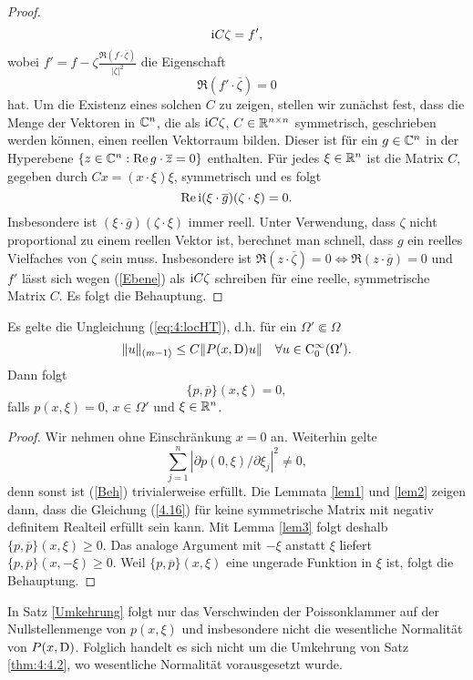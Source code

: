 \begin{proof}
\begin{equation}
	\mathrm i C \zeta = f',
\end{equation}
wobei $f' = f - \zeta \frac{\Re( f\cdot\overline\zeta)}{|\zeta|^2}$ die Eigenschaft
\begin{equation}
	\label{Ebene}
\Re (f'\cdot\overline\zeta) = 0
\end{equation}
hat. Um die Existenz eines solchen $C$ zu zeigen, stellen wir zunächst fest, dass die Menge der Vektoren in $\mathbb C^n$, die als $\mathrm i C \zeta$, $C \in \mathbb R^{n \times n}$ symmetrisch, geschrieben werden können, einen reellen Vektorraum bilden. Dieser ist für ein $g \in \mathbb C^n$ in der Hyperebene $\{ z \in \mathbb C^n : \operatorname{Re} g\cdot \overline z = 0 \}$ enthalten. Für jedes $\xi \in \mathbb R^n$ ist die Matrix $C$, gegeben durch $C x =  (x\cdot\xi)\xi$, symmetrisch und es folgt
\begin{equation}
\operatorname{Re} \mathrm i (\xi\cdot\overline g)(\zeta\cdot\xi) = 0.
\end{equation}
Insbesondere ist $(\xi\cdot\overline g)(\zeta\cdot\xi) $ immer reell. Unter Verwendung, dass $\zeta$ nicht proportional zu einem reellen Vektor ist, berechnet man schnell, dass $g$ ein reelles Vielfaches von $\zeta$ sein muss. Insbesondere ist $\Re(z\cdot\overline\zeta) = 0 \Leftrightarrow \Re(z\cdot \overline g) = 0$ und $f'$ lässt sich wegen (\ref{Ebene}) als $\mathrm i C \zeta$ schreiben für eine reelle, symmetrische Matrix $C$.  Es folgt die Behauptung.
\end{proof}

\begin{thm}
\label{Umkehrung}
Es gelte die Ungleichung (\ref{eq:4:locHT}), d.h. für ein $\Omega'\Subset\Omega$
\begin{equation}
  \| u\|_{(m-1)} \le C \| P(x,\mathrm D) u \| \quad \forall u\in\mathrm C_0^\infty(\Omega').
\end{equation}
Dann folgt 
\begin{equation}
	\label{Beh}
\{p,\overline p\} (x,\xi) = 0,
\end{equation}
falls $p(x,\xi) = 0$, $x \in \Omega'$ und $ \xi \in \mathbb R^n$.
\end{thm}
\begin{proof}
Wir nehmen ohne Einschränkung $x=0$ an. Weiterhin gelte
\begin{equation}
\sum_{j=1}^{n}|\partial p(0,\xi)/\partial \xi_j|^2 \neq 0,
\end{equation}
denn sonst ist (\ref{Beh}) trivialerweise erfüllt. Die Lemmata \ref{lem1} und \ref{lem2} zeigen dann, dass die Gleichung (\ref{4.16}) für keine symmetrische Matrix mit negativ definitem Realteil erfüllt sein kann. Mit Lemma \ref{lem3} folgt deshalb $\{p,\overline p\}(x,\xi) \ge 0$. Das analoge Argument mit $-\xi$ anstatt $\xi$ liefert $\{p,\overline p\}(x,-\xi) \ge 0$. Weil $\{p,\overline p\}(x,\xi)$ eine ungerade Funktion in $\xi$ ist, folgt die Behauptung.
\end{proof}
\begin{rem}
In Satz \ref{Umkehrung} folgt nur das Verschwinden der Poissonklammer auf der Nullstellenmenge von $p(x,\xi)$ und insbesondere nicht die wesentliche Normalität von $P(x,\mathrm D)$. Folglich handelt es sich nicht um die Umkehrung von Satz \ref{thm:4:4.2}, wo wesentliche Normalität vorausgesetzt wurde.
\end{rem}